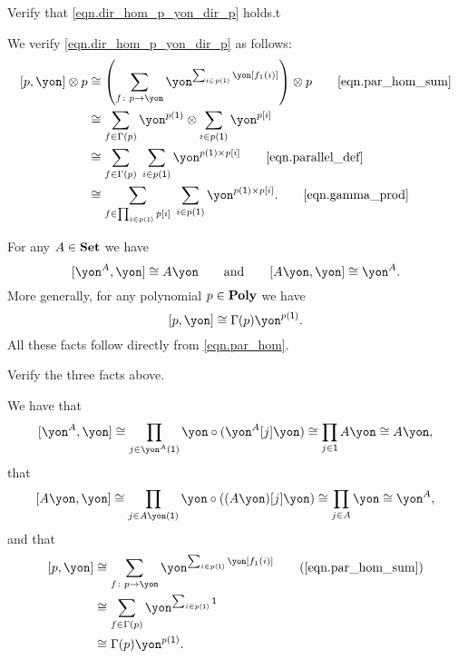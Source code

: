 \documentclass[Book-Poly]{subfiles}
\begin{document}
\begin{exercise} \label{exc.dir_hom_p_yon_dir_p}
Verify that \eqref{eqn.dir_hom_p_yon_dir_p} holds.t
\begin{solution}
We verify \eqref{eqn.dir_hom_p_yon_dir_p} as follows:
\begin{align*}
    \ihom{p, \yon} \otimes p
    &\iso
    \left(\sum_{f \colon p \to \yon} \yon^{\sum_{i \in p(\1)} \yon[f_1(i)]}\right) \otimes p
    \tag*{\eqref{eqn.par_hom_sum}} \\
    &\iso
    \sum_{f \in \Gamma(p)} \yon^{p(\1)} \otimes \sum_{i \in p(\1)} \yon^{p[i]} \\
    &\iso
    \sum_{f \in \Gamma(p)} \; \sum_{i \in p(\1)} \yon^{p(\1) \times p[i]}
    \tag*{\eqref{eqn.parallel_def}} \\
    &\iso
    \sum_{f \in \prod_{i \in p(\1)} p[i]} \; \sum_{i \in p(\1)} \yon^{p(\1) \times p[i]}.
    \tag*{\eqref{eqn.gamma_prod}}
\end{align*}
\end{solution}
\end{exercise}

\begin{example}\label{ex.parallel_dual}
For any $A\in\mathbf{Set}$ we have
\[
  \ihom{\yon^A,\yon} \iso A\yon
  \qqand
  \ihom{A\yon,\yon} \iso \yon^A.
\]
More generally, for any polynomial $p\in\mathbf{Poly}$ we have
\begin{equation}\label{eqn.dir_dual}
  \ihom{p,\yon} \iso \Gamma(p)\yon^{p(\1)}.
\end{equation}
All these facts follow directly from \eqref{eqn.par_hom}.
\end{example}

\begin{exercise}
Verify the three facts above.
\begin{solution}
We have that
\[
    \ihom{\yon^A, \yon} \iso \prod_{j \in \yon^A(\1)} \yon \circ (\yon^A[j]\yon) \iso \prod_{j \in \1} A\yon \iso A\yon,
\]
that
\[
    \ihom{A\yon, \yon} \iso \prod_{j \in A\yon(\1)} \yon \circ ((A\yon)[j]\yon) \iso \prod_{j \in A} \yon \iso \yon^A,
\]
and that
\begin{align*}
    \ihom{p, \yon} &\iso \sum_{f \colon p \to \yon} \yon^{\sum_{i \in p(\1)} \yon[f_1(i)]} \tag{\cref{eqn.par_hom_sum}} \\
    &\iso \sum_{f \in \Gamma(p)} \yon^{\sum_{i \in p(\1)} \1} \\
    &\iso \Gamma(p)\yon^{p(\1)}.
\end{align*}
\end{solution}
\end{exercise}
\end{document}
